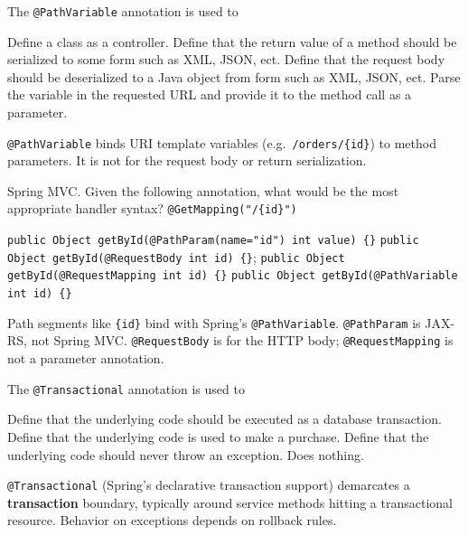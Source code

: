 \question[4]
The \texttt{@PathVariable} annotation is used to
\begin{choices}
  \choice Define a class as a controller.
  \choice Define that the return value of a method should be serialized to some form such as XML, JSON, ect.
  \choice Define that the request body should be deserialized to a Java object from form such as XML, JSON, ect.
  \CorrectChoice Parse the variable in the requested URL and provide it to the method call as a parameter.
\end{choices}
\begin{solution}
  \texttt{@PathVariable} binds URI template variables (e.g.\ \texttt{/orders/\{id\}}) to method parameters. It is not for the request body or return serialization.
\end{solution}

\question[4]
Spring MVC. Given the following annotation, what would be the most appropriate handler syntax?
\texttt{@GetMapping("/\{id\}")}
\begin{choices}
  \choice \texttt{public Object getById(@PathParam(name="id") int value) \{\}}
  \choice \texttt{public Object getById(@RequestBody int id) \{\}};
  \choice \texttt{public Object getById(@RequestMapping int id) \{\}}
  \CorrectChoice \texttt{public Object getById(@PathVariable int id) \{\}}
\end{choices}
\begin{solution}
  Path segments like \texttt{\{id\}} bind with Spring's \texttt{@PathVariable}. \texttt{@PathParam} is JAX-RS, not Spring MVC. \texttt{@RequestBody} is for the HTTP body; \texttt{@RequestMapping} is not a parameter annotation.
\end{solution}

\question[4]
The \texttt{@Transactional} annotation is used to
\begin{choices}
  \CorrectChoice Define that the underlying code should be executed as a database transaction.
  \choice Define that the underlying code is used to make a purchase.
  \choice Define that the underlying code should never throw an exception.
  \choice Does nothing.
\end{choices}
\begin{solution}
  \texttt{@Transactional} (Spring's declarative transaction support) demarcates a \textbf{transaction} boundary, typically around service methods hitting a transactional resource. Behavior on exceptions depends on rollback rules.
\end{solution}

